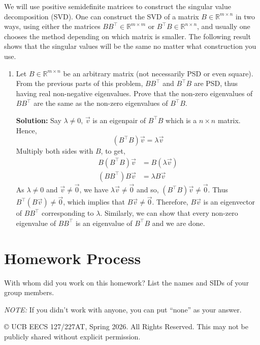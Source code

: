 \documentclass[10pt]{article}
\theoremstyle{definition}
\theoremstyle{plain}
\newcommand{\RR}{\mathbb{R}}
\begin{document}
We will use positive semidefinite matrices to construct the singular value decomposition (SVD). One can construct the SVD of a matrix $B \in \RR^{m \times n}$ in two ways, using either the matrices $BB^\top \in \RR^{m \times m}$ or $B^\top B \in \RR^{n \times n}$, and usually one chooses the method depending on which matrix is smaller. The following result shows that the singular values will be the same no matter what construction you use.

\begin{enumerate}[label=(\alph*), resume]
    \item Let $B \in \RR^{m \times n}$ be an arbitrary matrix (not necessarily PSD or even square). From the previous parts of this problem, $BB^\top$ and $B^\top B$ are PSD, thus having real non-negative eigenvalues. Prove that the non-zero eigenvalues of $BB^\top$ are the same as the non-zero eigenvalues of $B^\top B$.

    \textbf{Solution:} Say $\lambda \ne 0$, $\vec{v}$ is an eigenpair of $B^\top B$ which is a $n \times n$ matrix. Hence,
    \begin{equation}
        (B^\top B)\vec{v} = \lambda \vec{v}
    \end{equation}
    Multiply both sides with $B$, to get,
    \begin{align}
        B(B^\top B)\vec{v} &= B(\lambda \vec{v}) \\
        (BB^\top)B\vec{v} &= \lambda B\vec{v}
    \end{align}
    As $\lambda \ne 0$ and $\vec{v} \ne \vec{0}$, we have $\lambda \vec{v} \ne \vec{0}$ and so, $(B^\top B)\vec{v} \ne \vec{0}$. Thus $B^\top(B\vec{v}) \ne \vec{0}$, which implies that $B\vec{v} \ne \vec{0}$. Therefore, $B\vec{v}$ is an eigenvector of $BB^\top$ corresponding to $\lambda$. Similarly, we can show that every non-zero eigenvalue of $BB^\top$ is an eigenvalue of $B^\top B$ and we are done.
\end{enumerate}

\section{Homework Process}

With whom did you work on this homework? List the names and SIDs of your group members.

\emph{NOTE:} If you didn't work with anyone, you can put ``none'' as your answer.

\vfill
\begin{center}
    \small \copyright{} UCB EECS 127/227AT, Spring 2026. All Rights Reserved. This may not be publicly shared without explicit permission.
\end{center}
\end{document}
